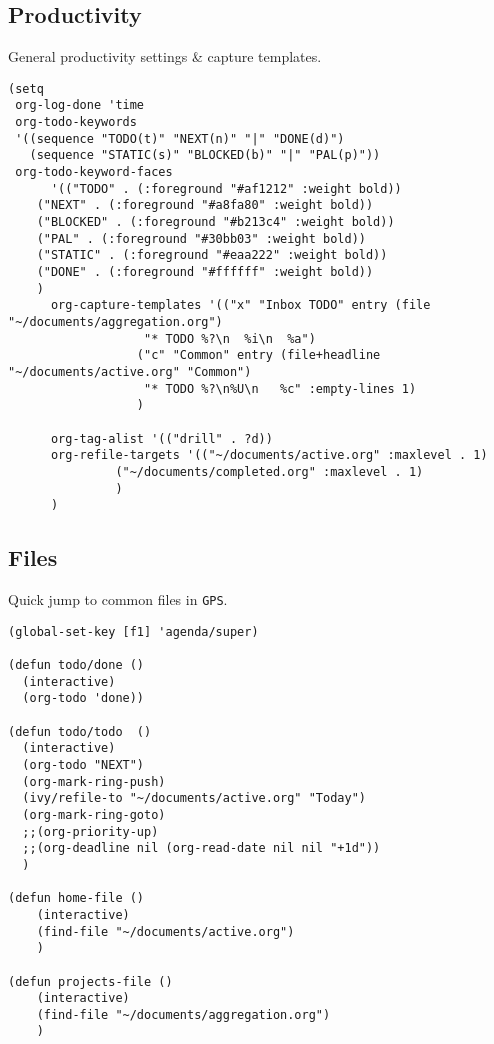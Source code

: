 \documentclass[11pt]{article}
\begin{document}
\subsection{Productivity}
\label{sec:org9a056ea}
General productivity settings \& capture templates.
\begin{verbatim}
(setq
 org-log-done 'time
 org-todo-keywords
 '((sequence "TODO(t)" "NEXT(n)" "|" "DONE(d)")
   (sequence "STATIC(s)" "BLOCKED(b)" "|" "PAL(p)"))
 org-todo-keyword-faces
      '(("TODO" . (:foreground "#af1212" :weight bold))
	("NEXT" . (:foreground "#a8fa80" :weight bold))
	("BLOCKED" . (:foreground "#b213c4" :weight bold))
	("PAL" . (:foreground "#30bb03" :weight bold))
	("STATIC" . (:foreground "#eaa222" :weight bold))
	("DONE" . (:foreground "#ffffff" :weight bold))
	)
      org-capture-templates '(("x" "Inbox TODO" entry (file "~/documents/aggregation.org")
			       "* TODO %?\n  %i\n  %a")
			      ("c" "Common" entry (file+headline "~/documents/active.org" "Common")
			       "* TODO %?\n%U\n   %c" :empty-lines 1)
			      )

      org-tag-alist '(("drill" . ?d))
      org-refile-targets '(("~/documents/active.org" :maxlevel . 1)
			   ("~/documents/completed.org" :maxlevel . 1)
			   )
      )
\end{verbatim}
\subsection{Files}
\label{sec:org58f79f6}
Quick jump to common files in \texttt{GPS}.
\begin{verbatim}
(global-set-key [f1] 'agenda/super)

(defun todo/done ()
  (interactive)
  (org-todo 'done))

(defun todo/todo  ()
  (interactive)
  (org-todo "NEXT")
  (org-mark-ring-push)
  (ivy/refile-to "~/documents/active.org" "Today")
  (org-mark-ring-goto)
  ;;(org-priority-up)
  ;;(org-deadline nil (org-read-date nil nil "+1d"))
  )

(defun home-file ()
    (interactive)
    (find-file "~/documents/active.org")
    )

(defun projects-file ()
    (interactive)
    (find-file "~/documents/aggregation.org")
    )

\end{verbatim}
\end{document}
